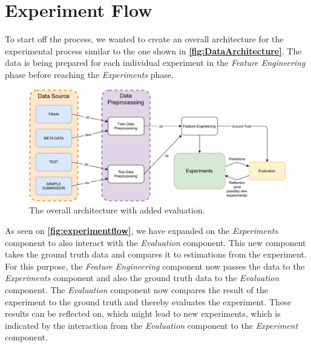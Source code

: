 \section{Experiment Flow}
To start off the process, we wanted to create an overall architecture for the experimental process similar to the one shown in \textbf{\autoref{fig:DataArchitecture}}. The data is being prepared for each individual experiment in the \textit{Feature Engineering} phase before reaching the \textit{Experiments} phase.

\begin{figure}[H]
    \centering
    \includegraphics[scale=.7]{Images/Experiments/ExperimentFlow.pdf}
    \caption{The overall architecture with added evaluation.}
    \label{fig:experimentflow}
\end{figure}

As seen on \textbf{\autoref{fig:experimentflow}}, we have expanded on the \textit{Experiments} component to also interact with the \textit{Evaluation} component. This new component takes the ground truth data and compares it to estimations from the experiment. For this purpose, the \textit{Feature Engineering} component now passes the data to the \textit{Experiments} component and also the ground truth data to the \textit{Evaluation} component. The \textit{Evaluation} component now compares the result of the experiment to the ground truth and thereby evaluates the experiment. These results can be reflected on, which might lead to new experiments, which is indicated by the interaction from the \textit{Evaluation} component to the \textit{Experiment} component.

